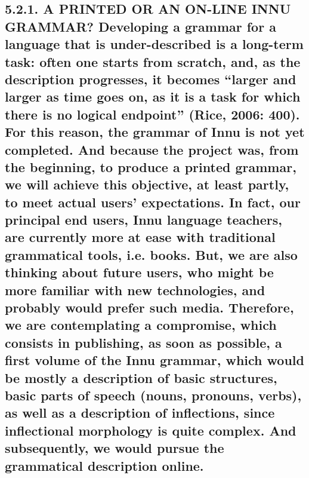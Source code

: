 \documentclass[letterpaper]{article}
\begin{document}
\subsection[5.2.1. A PRINTED OR AN ON{}-LINE INNU GRAMMAR? Developing a grammar for a language that is under{}-described is a long{}-term task: often one starts from scratch, and, as the description progresses, \ it becomes {\textquotedblleft}larger and larger as time goes on, as it is a task for which there is no logical endpoint{\textquotedblright} (Rice, 2006: 400). For this reason, the grammar of Innu is not yet completed. And because the project was, from the beginning, to produce a printed grammar, we will achieve this objective, at least partly, to meet actual users{\textquoteright} expectations. In fact, our principal end users, Innu language teachers, are currently more at ease with traditional grammatical tools, \ i.e. books. But, we are also thinking about future users, who might be more familiar with new technologies, and probably would prefer such media. Therefore, we are contemplating a compromise, which consists in publishing, as soon as possible, a first volume of the Innu grammar, which would be mostly a description of basic structures, basic parts of speech (nouns, pronouns, verbs), as well as a description of inflections, since inflectional morphology is quite complex. And subsequently, we would pursue the grammatical description online.]{5.2.1. A PRINTED OR AN ON-LINE INNU GRAMMAR? \textmd{Developing }\textmd{a grammar for a language that is under}\textmd{{}-}\textmd{described is a long-term task}\textmd{:}\textmd{ }\textmd{often}\textmd{ one}\textmd{ }\textmd{start}\textmd{s}\textmd{ from scratch, and, as }\textmd{the description}\textmd{ progress}\textmd{es}\textmd{, }\textmd{ it becomes }\textmd{{\textquotedblleft}larger and larger as time goes on, as it is a task for which there is no logical endpoint{\textquotedblright} (Rice, 2006: 400). For th}\textmd{is}\textmd{ reason, }\textmd{the grammar of }\textmd{Innu is not yet completed. And because the project was, from the beginning, to produce a printed grammar, we will achieve th}\textmd{is}\textmd{ objective, at least partly, to meet actual users}\textmd{{\textquoteright}}\textmd{ expectations. }\textmd{In fact, }\textmd{our principal}\textmd{ end users}\textmd{, Innu language teachers, are}\textmd{ currently }\textmd{more at ease with traditional grammatical tools, }\textmd{ i.e. }\textmd{books. But, we }\textmd{are }\textmd{also }\textmd{thinking }\textmd{about future users, wh}\textmd{o}\textmd{ might be more familiar with new technologies, and probably would prefer such media. }\textmd{Therefore}\textmd{, we }\textmd{are }\textmd{contemplat}\textmd{ing}\textmd{ a compromise, which consists }\textmd{in}\textmd{ publish}\textmd{ing}\textmd{, as soon as possible, a first volume of the Innu grammar,}\textmd{ which would be }\textmd{mostly a description of basic structures, }\textmd{basic }\textmd{parts of speech (nouns, pronouns, verbs), }\textmd{as well as }\textmd{a description of inflections, since inflect}\textmd{ional}\textmd{ morphology is }\textmd{quite }\textmd{complex. }\textmd{And s}\textmd{ubsequently, we w}\textmd{ould}\textmd{ pursue the grammatical description online.}}
\end{document}
